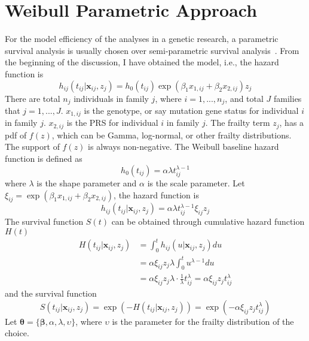\documentclass[preprint,12pt]{elsarticle}
\begin{document}
\section{Weibull Parametric Approach}
For the model efficiency of the analyses in a genetic research, a parametric survival analysis is usually chosen over semi-parametric survival analysis~\cite{rudolph2018parametric, berger2001statistical}.
From the beginning of the discussion, I have obtained the model, i.e., the hazard function is
\begin{equation}
    h_{ij}(t_{ij}|\mathbf{x}_{ij}, z_j)=h_0(t_{ij})\exp(\beta_1x_{1,ij}+\beta_2 x_{2,ij})z_j
\end{equation}
There are total $n_j$ individuals in family $j$, where $i=1,...,n_j$, and total $J$ families that $j=1,...,J$. $x_{1,ij}$ is the genotype, or say mutation gene status for individual $i$ in family $j$. $x_{2,ij}$
is the PRS for individual $i$ in family $j$. The frailty term $z_j$, has a pdf of $f(z)$, which can be Gamma, log-normal, or other frailty distributions.
The support of $f(z)$ is always non-negative. The Weibull baseline hazard function is defined as
\begin{equation}
    h_0(t_{ij})=\alpha\lambda t_{ij}^{\lambda-1}
\end{equation}
where $\lambda$ is the shape parameter and $\alpha$ is the scale parameter. Let $\xi_{ij}=\exp(\beta_1 x_{1,ij}+\beta_2 x_{2,ij})$, the hazard function is 
\begin{equation}
    h_{ij}(t_{ij}|\mathbf{x}_{ij}, z_j)=\alpha\lambda t_{ij}^{\lambda-1}\xi_{ij}z_j
\end{equation}
The survival function $S(t)$ can be obtained through cumulative hazard function $H(t)$
\begin{align}
    H(t_{ij}|\mathbf{x}_{ij}, z_j)&=\int_0^{t}h_{ij}(u|\mathbf{x}_{ij}, z_j)du\\
    &=\alpha\xi_{ij}z_j\lambda\int_0^t u^{\lambda-1}du\\
    &=\alpha\xi_{ij}z_j\lambda\cdot \frac{1}{\lambda} t_{ij}^{\lambda}=\alpha\xi_{ij}z_j t_{ij}^{\lambda}
\end{align}
and the survival function
\begin{equation}
    S(t_{ij}|\mathbf{x}_{ij}, z_j)=\exp(-H(t_{ij}|\mathbf{x}_{ij}, z_j))=\exp(-\alpha\xi_{ij}z_j t_{ij}^{\lambda})
\end{equation}
Let $\boldsymbol{\theta}=\{\boldsymbol{\beta}, \alpha, \lambda, \upsilon\}$, where $\upsilon$ is the parameter for the frailty distribution of the choice. 
\end{document}

